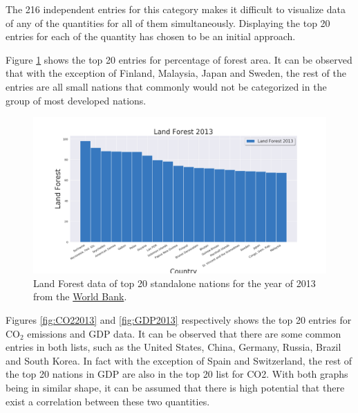 \documentclass[11pt,a4paper,titlepage]{article}
\newcommand{\blankline}{\quad\pagebreak[2]}
\begin{document}
\blankline

The 216 independent entries for this category makes it difficult to visualize data of any of the quantities for all of them simultaneously. Displaying the top 20 entries for each of the quantity has chosen to be an initial approach.

\blankline

Figure \ref{fig:LandForest2013} shows the top 20 entries for percentage of forest area. It can be observed that with the exception of Finland, Malaysia, Japan and Sweden, the rest of the entries are all small nations that commonly would not be categorized in the group of most developed nations.

\begin{figure}[!htbp]
    \begin{center}
        \includegraphics[width=\textwidth]{../Plots/LandForest_2013.png}
        \caption{Land Forest data of top 20 standalone nations for the year of 2013 from the \href{https://www.worldbank.org/}{World Bank}.}
        \label{fig:LandForest2013}
    \end{center}
\end{figure}

\blankline

Figures \ref{fig:CO22013} and \ref{fig:GDP2013} respectively shows the top 20 entries for CO$_{2}$ emissions and GDP data. It can be observed that there are some common entries in both lists, such as the United States, China, Germany, Russia, Brazil and South Korea. In fact with the exception of Spain and Switzerland, the rest of the top 20 nations in GDP are also in the top 20 list for CO2. With both graphs being in similar shape, it can be assumed that there is high potential that there exist a correlation between these two quantities.
\end{document}
